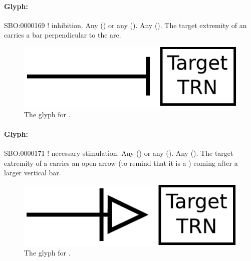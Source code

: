 \paragraph{Glyph: }\label{sec:inhibition}


\begin{glyphDescription}
 \glyphSboTerm SBO:0000169 ! inhibition.
 \glyphOrigin Any  () or any  ().
 \glyphTarget Any  ().
 \glyphNode The target extremity of an  carries a bar perpendicular to the arc.
 \end{glyphDescription}

\begin{figure}[H]
  \centering
  \includegraphics[scale = 0.5]{images/inhibition}
  \caption{The \PD glyph for .}
  \label{fig:inhibition}
\end{figure}


\paragraph{Glyph: }\label{sec:necessary_stim}


\begin{glyphDescription}
 \glyphSboTerm SBO:0000171 ! necessary stimulation.
 \glyphOrigin Any  () or any  ().
 \glyphTarget Any  ().
 \glyphNode The target extremity of a  carries an open arrow (to remind that it is a ) coming after a larger vertical bar.
 \end{glyphDescription}

\begin{figure}[H]
  \centering
  \includegraphics[scale = 0.5]{images/necessary_stim}
  \caption{The \PD glyph for .}
  \label{fig:Necessary Stimulation}
\end{figure}

